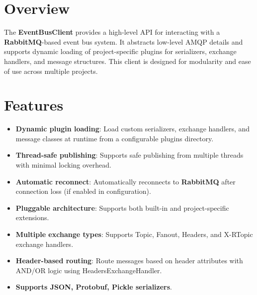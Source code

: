 




\section{Overview}\label{sec:overview}
The \textbf{EventBusClient} provides a high-level API for interacting with a \textbf{RabbitMQ}-based event bus system.
It abstracts low-level AMQP details and supports dynamic loading of project-specific plugins for serializers, exchange handlers, and message structures.
This client is designed for modularity and ease of use across multiple projects.


\section{Features}\label{sec:features}
\begin{itemize}
  \item \textbf{Dynamic plugin loading}: Load custom serializers, exchange handlers, and message classes at runtime from a configurable plugins directory.
  \item \textbf{Thread-safe publishing}: Supports safe publishing from multiple threads with minimal locking overhead.
  \item \textbf{Automatic reconnect}: Automatically reconnects to \textbf{RabbitMQ} after connection loss (if enabled in configuration).
  \item \textbf{Pluggable architecture}: Supports both built-in and project-specific extensions.
  \item \textbf{Multiple exchange types}: Supports Topic, Fanout, Headers, and X-RTopic exchange handlers.
  \item \textbf{Header-based routing}: Route messages based on header attributes with AND/OR logic using HeadersExchangeHandler.
  \item \textbf{Supports JSON, Protobuf, Pickle serializers}.
\end{itemize}

